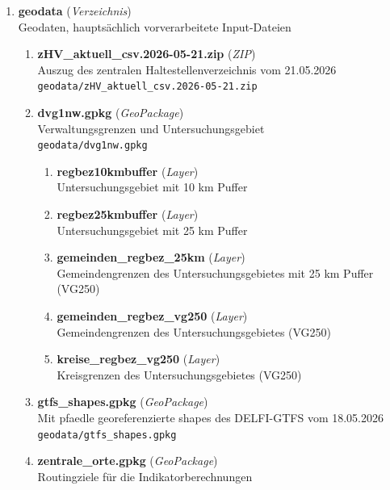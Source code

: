 \begin{enumerate}[label=\arabic*, leftmargin=*, itemsep=0.5em, topsep=0.3em]
\item \textbf{geodata} \textnormal{(\textit{Verzeichnis})}\\
Geodaten, hauptsächlich vorverarbeitete Input-Dateien
\begin{enumerate}[label=\arabic{enumi}.\arabic*, leftmargin=*, itemsep=0.5em, topsep=0.3em]
\item \textbf{zHV\_aktuell\_csv.2026-05-21.zip} \textnormal{(\textit{ZIP})}\\
Auszug des zentralen Haltestellenverzeichnis vom 21.05.2026\\
\texttt{\small geodata/zHV\_aktuell\_csv.2026-05-21.zip}
\item \textbf{dvg1nw.gpkg} \textnormal{(\textit{GeoPackage})}\\
Verwaltungsgrenzen und Untersuchungsgebiet\\
\texttt{\small geodata/dvg1nw.gpkg}
\begin{enumerate}[label=\arabic{enumi}.\arabic{enumii}.\arabic*, leftmargin=*, itemsep=0.5em, topsep=0.3em]
\item \textbf{regbez10kmbuffer} \textnormal{(\textit{Layer})}\\
Untersuchungsgebiet mit 10 km Puffer
\item \textbf{regbez25kmbuffer} \textnormal{(\textit{Layer})}\\
Untersuchungsgebiet mit 25 km Puffer
\item \textbf{gemeinden\_regbez\_25km} \textnormal{(\textit{Layer})}\\
Gemeindengrenzen des Untersuchungsgebietes mit 25 km Puffer (VG250)
\item \textbf{gemeinden\_regbez\_vg250} \textnormal{(\textit{Layer})}\\
Gemeindengrenzen des Untersuchungsgebietes (VG250)
\item \textbf{kreise\_regbez\_vg250} \textnormal{(\textit{Layer})}\\
Kreisgrenzen des Untersuchungsgebietes (VG250)
\end{enumerate}
\item \textbf{gtfs\_shapes.gpkg} \textnormal{(\textit{GeoPackage})}\\
Mit pfaedle georeferenzierte shapes des DELFI-GTFS vom 18.05.2026\\
\texttt{\small geodata/gtfs\_shapes.gpkg}
\item \textbf{zentrale\_orte.gpkg} \textnormal{(\textit{GeoPackage})}\\
Routingziele für die Indikatorberechnungen\\

\end{enumerate}
\end{enumerate}
